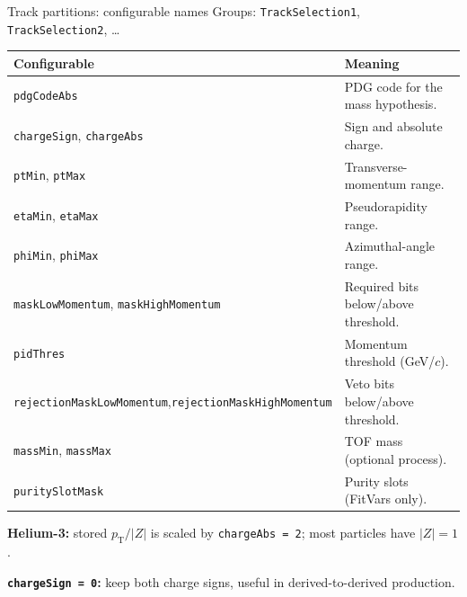 \begin{frame}[shrink=8]{Track partitions: configurable names}
        \small Groups: \texttt{TrackSelection1},
        \texttt{TrackSelection2}, \ldots\par
        \medskip
        \footnotesize
        \renewcommand{\arraystretch}{1.0}
        \begin{tabular}{p{}p{}}
                \toprule
                Configurable & Meaning\\
                \midrule
                \texttt{pdgCodeAbs} & PDG code for the mass hypothesis.\\
                \texttt{chargeSign}, \texttt{chargeAbs} & Sign and
                absolute charge.\\
                \texttt{ptMin}, \texttt{ptMax} & Transverse-momentum range.\\
                \texttt{etaMin}, \texttt{etaMax} & Pseudorapidity range.\\
                \texttt{phiMin}, \texttt{phiMax} & Azimuthal-angle range.\\
                \texttt{maskLowMomentum}, \texttt{maskHighMomentum} &
                Required bits below/above threshold.\\
                \texttt{pidThres} & Momentum threshold (GeV/$c$).\\
                \texttt{rejectionMaskLowMomentum},\newline\texttt{rejectionMaskHighMomentum}
                & Veto bits below/above threshold.\\
                \texttt{massMin}, \texttt{massMax} & TOF mass
                (optional process).\\
                \texttt{puritySlotMask} & Purity slots (FitVars only).\\
                \bottomrule
        \end{tabular}
        \medskip
        \footnotesize\textbf{Helium-3:} stored $p_{\mathrm T}/|Z|$ is
        scaled by \texttt{chargeAbs = 2}; most particles have $|Z|=1$.\par
        \textbf{\texttt{chargeSign = 0}:} keep both charge signs,
        useful in derived-to-derived production.
\end{frame}
